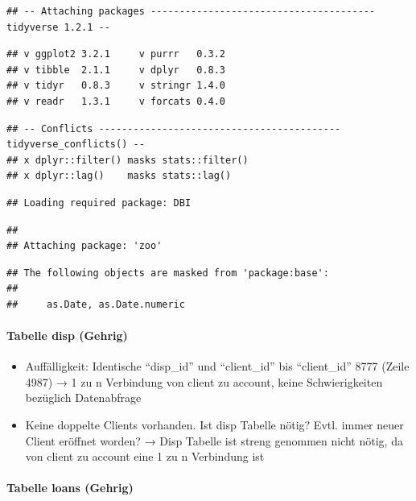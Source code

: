 \documentclass[]{article}
\title{}
\author{}
\date{}
\let\oldparagraph\paragraph
\renewcommand{\paragraph}[1]{\oldparagraph{#1}\mbox{}}
\begin{document}
\begin{verbatim}
## -- Attaching packages --------------------------------------- tidyverse 1.2.1 --
\end{verbatim}

\begin{verbatim}
## v ggplot2 3.2.1     v purrr   0.3.2
## v tibble  2.1.1     v dplyr   0.8.3
## v tidyr   0.8.3     v stringr 1.4.0
## v readr   1.3.1     v forcats 0.4.0
\end{verbatim}

\begin{verbatim}
## -- Conflicts ------------------------------------------ tidyverse_conflicts() --
## x dplyr::filter() masks stats::filter()
## x dplyr::lag()    masks stats::lag()
\end{verbatim}

\begin{verbatim}
## Loading required package: DBI
\end{verbatim}

\begin{verbatim}
## 
## Attaching package: 'zoo'
\end{verbatim}

\begin{verbatim}
## The following objects are masked from 'package:base':
## 
##     as.Date, as.Date.numeric
\end{verbatim}

\hypertarget{tabelle-disp-gehrig}{%
\paragraph{Tabelle disp (Gehrig)}\label{tabelle-disp-gehrig}}

\begin{itemize}
\item
  Auffälligkeit: Identische ``disp\_id'' und ``client\_id'' bis
  ``client\_id'' 8777 (Zeile 4987) → 1 zu n Verbindung von client zu
  account, keine Schwierigkeiten bezüglich Datenabfrage
\item
  Keine doppelte Clients vorhanden. Ist disp Tabelle nötig? Evtl. immer
  neuer Client eröffnet worden? → Disp Tabelle ist streng genommen nicht
  nötig, da von client zu account eine 1 zu n Verbindung ist
\end{itemize}

\hypertarget{tabelle-loans-gehrig}{%
\paragraph{Tabelle loans (Gehrig)}\label{tabelle-loans-gehrig}}
\end{document}
